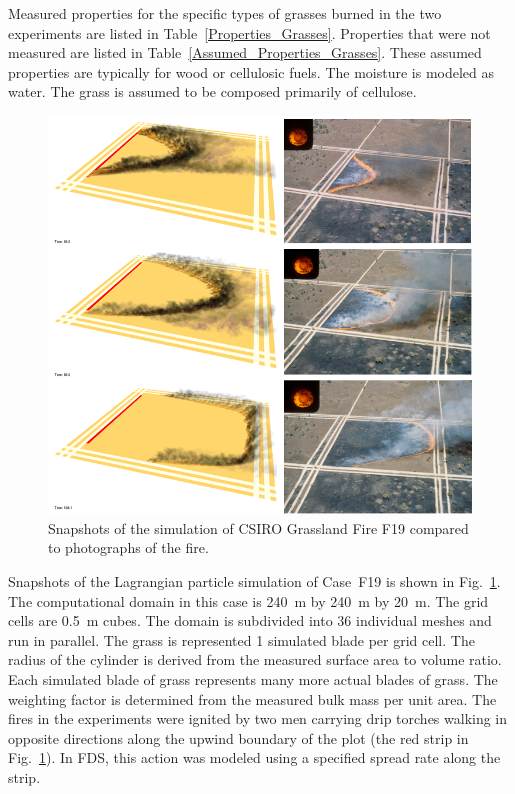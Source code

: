 Measured properties for the specific types of grasses burned in the two experiments are listed in Table~\ref{Properties_Grasses}. Properties that were not measured are listed in Table~\ref{Assumed_Properties_Grasses}. These assumed properties are typically for wood or cellulosic fuels. The moisture is modeled as water. The grass is assumed to be composed primarily of cellulose.



\begin{figure}[p]
\includegraphics[width=\textwidth]{FIGURES/CSIRO_Grassland_Fires/F19_collage.png}
\caption[Snapshots of the simulation of CSIRO Grassland Fire F19]{Snapshots of the simulation of CSIRO Grassland Fire F19 compared to photographs of the fire.}
\label{F19}
\end{figure}

Snapshots of the Lagrangian particle simulation of Case~F19 is shown in Fig.~\ref{F19}. The computational domain in this case is 240~m by 240~m by 20~m. The grid cells are 0.5~m cubes. The domain is subdivided into 36 individual meshes and run in parallel. The grass is represented 1 simulated blade per grid cell. The radius of the cylinder is derived from the measured surface area to volume ratio. Each simulated blade of grass represents many more actual blades of grass. The weighting factor is determined from the measured bulk mass per unit area. The fires in the experiments were ignited by two men carrying drip torches walking in opposite directions along the upwind boundary of the plot (the red strip in Fig.~\ref{F19}). In FDS, this action was modeled using a specified spread rate along the strip.

